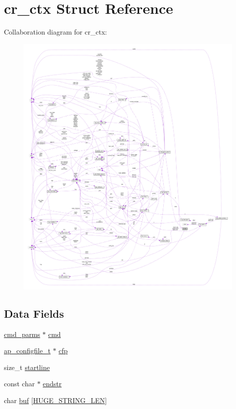 \hypertarget{structcr__ctx}{}\section{cr\+\_\+ctx Struct Reference}
\label{structcr__ctx}


Collaboration diagram for cr\+\_\+ctx\+:
\nopagebreak
\begin{figure}[H]
\begin{center}
\leavevmode
\includegraphics[width=350pt]{structcr__ctx__coll__graph}
\end{center}
\end{figure}
\subsection*{Data Fields}
\begin{DoxyCompactItemize}
\item 
\hyperlink{group__APACHE__CORE__CONFIG_ga1791fbd28d06a9847bad001541c5241e}{cmd\+\_\+parms} $\ast$ \hyperlink{structcr__ctx_afbf28b2f265de79bdf9b51c429753999}{cmd}
\item 
\hyperlink{structap__configfile__t}{ap\+\_\+configfile\+\_\+t} $\ast$ \hyperlink{structcr__ctx_a22886189237b4a7a3685150cc4c205ee}{cfp}
\item 
size\+\_\+t \hyperlink{structcr__ctx_a32efa76a4304e6e815d9835222026c6f}{startline}
\item 
const char $\ast$ \hyperlink{structcr__ctx_a120b0ab6cc06d525401c79bab8458d9f}{endstr}
\item 
char \hyperlink{structcr__ctx_acb09cccbeae1286ec559c80277503bec}{buf} \mbox{[}\hyperlink{group__apr__lib_ga0c9dd98f46b90b5bcd4cbf75e252d0da}{H\+U\+G\+E\+\_\+\+S\+T\+R\+I\+N\+G\+\_\+\+L\+EN}\mbox{]}
\end{DoxyCompactItemize}


